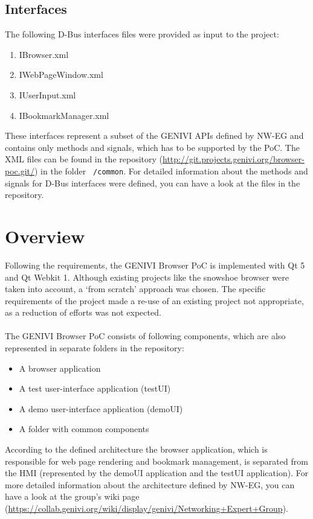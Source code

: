 \documentclass{pelagicore}
\begin{document}
\subsection{Interfaces}
The following D-Bus interfaces files were provided as input to the project:

\begin{enumerate}
    \item IBrowser.xml
    \item IWebPageWindow.xml
    \item IUserInput.xml
    \item IBookmarkManager.xml
\end{enumerate}

These interfaces represent a subset of the GENIVI APIs defined by NW-EG and
contains only methods and signals, which has to be supported by the PoC. The
XML files can be found in the repository
(\url{http://git.projects.genivi.org/browser-poc.git/}) in the folder {\tt
/common}. For detailed information about the methods and signals for D-Bus
interfaces were defined, you can have a look at the files in the repository.

\section{Overview}
Following the requirements, the GENIVI Browser PoC is implemented with Qt 5 and
Qt Webkit 1. Although existing projects like the snowshoe browser were taken
into account, a `from scratch' approach was chosen. The specific requirements
of the project made a re-use of an existing project not appropriate, as a
reduction of efforts was not expected.
\\\\
The GENIVI Browser PoC consists of following components, which are also represented in
separate folders in the repository:

\begin{itemize}
    \item A browser application
    \item A test user-interface application (testUI)
    \item A demo user-interface application (demoUI)
    \item A folder with common components
\end{itemize}

According to the defined architecture the browser application, which is
responsible for web page rendering and bookmark management, is separated from
the HMI (represented by the demoUI application and the testUI application). For
more detailed information about the architecture defined by NW-EG, you can have
a look at the group's wiki page
(\url{https://collab.genivi.org/wiki/display/genivi/Networking+Expert+Group}).
\end{document}
